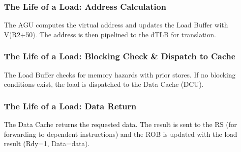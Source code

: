 \documentclass[aspectratio=169,12pt]{beamer}
\begin{document}
\begin{frame}
\frametitle{The Life of a Load: Address Calculation}
\begin{center}
\LoadLifecycleDiagram[
    rat3={RF0},
    robOp={Ld},
    robValid={1},
    robRdy={0},
    robData={X},
    iq1={R3$\leftarrow$MEM(R2+50)},
    lbV={1},
    lbAddr={V(R2+50)},
    lbBC={0},
    arrowDTLB=1
]
\end{center}
\vspace{-2mm}
\begin{tcolorbox}[colback=blue!5!white,colframe=blue!75!black]
The AGU computes the virtual address and updates the Load Buffer with V(R2+50). The address is then pipelined to the dTLB for translation.
\end{tcolorbox}
\end{frame}

\begin{frame}
\frametitle{The Life of a Load: Blocking Check \& Dispatch to Cache}
\begin{center}
\LoadLifecycleDiagram[
    rat3={RF0},
    robOp={Ld},
    robValid={1},
    robRdy={0},
    robData={X},
    iq1={R3$\leftarrow$MEM(R2+50)},
    lbV={1},
    lbAddr={V(R2+50)},
    lbBC={0},
    arrowCache=1
]
\end{center}
\vspace{-2mm}
\begin{tcolorbox}[colback=blue!5!white,colframe=blue!75!black]
The Load Buffer checks for memory hazards with prior stores. If no blocking conditions exist, the load is dispatched to the Data Cache (DCU).
\end{tcolorbox}
\end{frame}

\begin{frame}
\frametitle{The Life of a Load: Data Return}
\begin{center}
\LoadLifecycleDiagram[
    rat3={RF0},
    robOp={Ld},
    robValid={1},
    robRdy={1},
    robData={data},
    iq1={R3$\leftarrow$MEM(R2+50)},
    lbV={1},
    lbAddr={V(R2+50)},
    lbBC={0},
    arrowCache=1
]
\end{center}
\vspace{-2mm}
\begin{tcolorbox}[colback=blue!5!white,colframe=blue!75!black]
The Data Cache returns the requested data. The result is sent to the RS (for forwarding to dependent instructions) and the ROB is updated with the load result (Rdy=1, Data=data).
\end{tcolorbox}
\end{frame}
\end{document}
